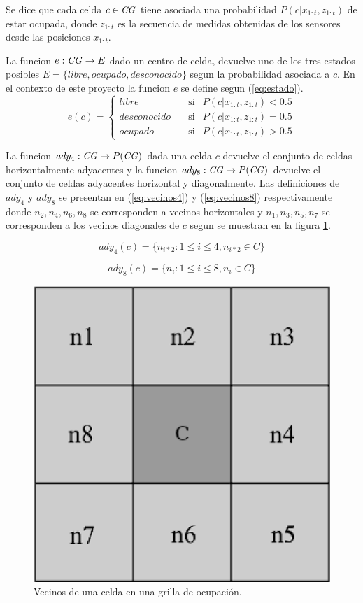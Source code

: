 Se dice que cada celda $c\in \mathit{CG}$ tiene asociada una probabilidad $P(c|x_{1:t},z_{1:t})$
de estar ocupada, donde $z_{1:t}$ es la secuencia de medidas obtenidas de los
sensores desde las posiciones $x_{1:t}$.

La funcion $e : \mathit{CG} \rightarrow E$ dado un centro de celda, devuelve uno de los
tres estados posibles $E=\{libre, ocupado, desconocido\}$ segun la probabilidad
asociada a $c$. En el contexto de este proyecto la funcion $e$ se define segun
(\ref{eq:estado}).
\begin{equation} 
  e(c)= 
  \left \{ 
    \begin{aligned}
       libre       &\ \ \ \text{ si}& P(c|x_{1:t},z_{1:t}) < 0.5 \\
       desconocido &\ \ \ \text{ si}& P(c|x_{1:t},z_{1:t}) = 0.5 \\
       ocupado     &\ \ \ \text{ si}& P(c|x_{1:t},z_{1:t}) > 0.5
    \end{aligned}
  \right .
  \label{eq:estado}
\end{equation}

La funcion $ady_4 : \mathit{CG} \rightarrow P(\mathit{CG})$ dada una celda $c$ devuelve el conjunto
de celdas horizontalmente adyacentes y la funcion $ady_8 : \mathit{CG} \rightarrow P(\mathit{CG})$
devuelve el conjunto de celdas adyacentes horizontal y diagonalmente. Las
definiciones de $ady_4$ y $ady_8$ se presentan en (\ref{eq:vecinos4}) y
(\ref{eq:vecinos8}) respectivamente donde $n_2, n_4, n_6, n_8$ se corresponden
a vecinos horizontales y $n_1, n_3, n_5, n_7$ se corresponden a los vecinos
diagonales de $c$ segun se muestran en la figura \ref{fig:vecinos}.

\begin{equation} 
 ady_4(c)=\{n_{i*2} : 1\leq i \leq 4, n_{i*2} \in C\}
 \label{eq:vecinos4}
\end{equation} 

\begin{equation} 
 ady_8(c)=\{n_i : 1\leq i \leq 8, n_i \in C\}
 \label{eq:vecinos8}
\end{equation} 

\begin{figure}[H]
  \center
  \includegraphics[width=0.3\linewidth]{imagenes/vecinosSharp.png}
  \caption[Vecinos de una celda en una grilla de ocupación.]{Vecinos de una celda en una grilla de ocupación.}
  \label{fig:vecinos}
\end{figure} 

